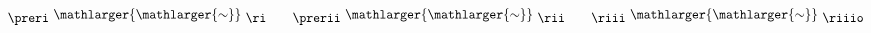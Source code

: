 \documentclass{standalone}
\begin{document}
$
\preri
\ \raisebox{.25em}{$\mathlarger{\mathlarger{\sim}}$}\
\ri
\qquad
\prerii
\ \raisebox{.25em}{$\mathlarger{\mathlarger{\sim}}$}\
\rii
\qquad
\riii
\ \raisebox{.25em}{$\mathlarger{\mathlarger{\sim}}$}\
\riiio
$
\end{document}
